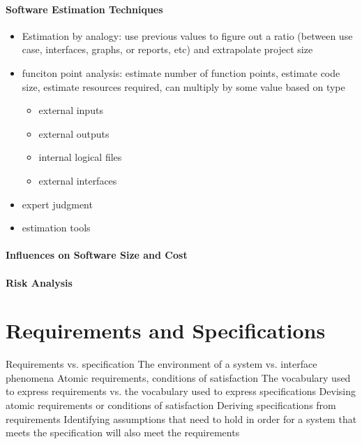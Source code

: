 \documentclass[12pt]{article}
\begin{document}
\paragraph{Software Estimation Techniques} 
\label{par:software_estimation_techniques}
\begin{itemize}
	\item Estimation by analogy: use previous values to figure out a ratio (between use case, interfaces, graphs, or reports, etc) and extrapolate project size
	\item funciton point analysis: estimate number of function points, estimate code size, estimate resources required, can multiply by some value based on type
	\begin{itemize}
		\item external inputs
		\item external outputs
		\item internal logical files
		\item external interfaces
	\end{itemize}
	\item expert judgment
	\item estimation tools
\end{itemize}


\paragraph{Influences on Software Size and Cost} 
\label{par:influences_on_software_size_and_cost}


\paragraph{Risk Analysis} 
\label{par:risk_analysis}


\section*{Requirements and Specifications}
\label{sec:requirements_and_specifications}
Requirements vs. specification
The environment of a system vs. interface phenomena
Atomic requirements, conditions of satisfaction
The vocabulary used to express requirements vs. the vocabulary
used to express specifications
Devising atomic requirements or conditions of satisfaction
Deriving specifications from requirements
Identifying assumptions that need to hold in order for a system that meets the specification will also meet the requirements
\end{document}
